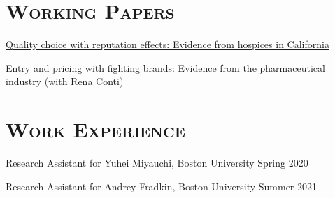 \documentclass[11pt,overlapped,line,letterpaper]{res}
\newenvironment{list1}{
  \begin{list}{\ding{113}}{%
      \setlength{\itemsep}{0in} \setlength{\itemindent}{-1.6em}
      \setlength{\parsep}{0in} \setlength{\parskip}{0in}
      \setlength{\topsep}{0in} \setlength{\partopsep}{0in}
      \setlength{\leftmargin}{0.5in}}}{\end{list}}
\begin{document}
\begin{resume}

\section{\textbf{\textsc{Working Papers}}}
\begin{list1}
\item[] \href{https://rubaiyat-alam.github.io/website/jmp_rubaiyat.pdf}{Quality choice with reputation effects: Evidence from hospices in California }%
\item[] \href{https://rubaiyat-alam.github.io/website/pharma_ag_rubaiyat_conti.pdf}{Entry and pricing with fighting brands: Evidence from the pharmaceutical industry }(with Rena Conti)
\end{list1}

\section{\textbf{\textsc{Work Experience}}}
\begin{list1}
\item[] Research Assistant for Yuhei Miyauchi, Boston University \hfill{Spring 2020}
\item[] Research Assistant for Andrey Fradkin, Boston University \hfill{Summer 2021}
\end{list1}
\vspace{-4.5pt}



\end{resume}
\end{document}
